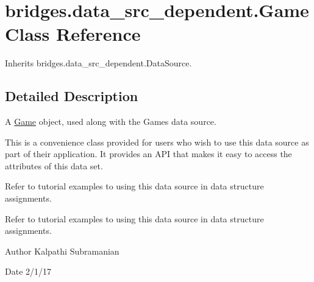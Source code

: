 \hypertarget{classbridges_1_1data__src__dependent_1_1_game}{}\section{bridges.\+data\+\_\+src\+\_\+dependent.\+Game Class Reference}
\label{classbridges_1_1data__src__dependent_1_1_game}


Inherits bridges.\+data\+\_\+src\+\_\+dependent.\+Data\+Source.



\subsection{Detailed Description}
A \mbox{\hyperlink{classbridges_1_1data__src__dependent_1_1_game}{Game}} object, used along with the Games data source. 

This is a convenience class provided for users who wish to use this data source as part of their application. It provides an A\+PI that makes it easy to access the attributes of this data set.

Refer to tutorial examples to using this data source in data structure assignments.

Refer to tutorial examples to using this data source in data structure assignments.

\begin{DoxyAuthor}{Author}
Kalpathi Subramanian 
\end{DoxyAuthor}
\begin{DoxyDate}{Date}
2/1/17 
\end{DoxyDate}

